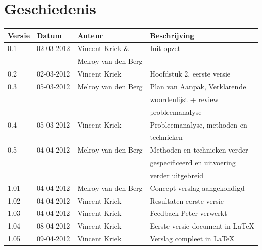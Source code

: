 \documentclass[]{article}
\begin{document}
\vspace*{\fill}

\section*{Geschiedenis}

\begin{tabular}{|| l | l | l | l ||}\hline
    Versie  &Datum       &Auteur              &Beschrijving                    \\\hline\hline
    0.1     &02-03-2012  &Vincent Kriek \&    &Init opzet                      \\
            &            &Melroy van den Berg &                                \\\hline
    0.2     &02-03-2012  &Vincent Kriek       &Hoofdstuk 2, eerste versie      \\\hline
    0.3     &05-03-2012  &Melroy van den Berg &Plan van Aanpak, Verklarende    \\
            &            &                    &woordenlijst + review           \\
            &            &                    &probleemanalyse                 \\\hline
    0.4     &05-03-2012  &Vincent Kriek       &Probleemanalyse, methoden en    \\
            &            &                    &technieken                      \\\hline
    0.5     &04-04-2012  &Melroy van den Berg &Methoden en technieken verder   \\
            &            &                    &gespecificeerd en uitvoering    \\
            &            &                    &verder uitgebreid               \\\hline
    1.01    &04-04-2012  &Melroy van den Berg &Concept verslag aangekondigd    \\\hline
    1.02    &04-04-2012  &Vincent Kriek       &Resultaten eerste versie        \\\hline
    1.03    &04-04-2012  &Vincent Kriek       &Feedback Peter verwerkt         \\\hline
    1.04    &08-04-2012  &Vincent Kriek       &Eerste versie document in \LaTeX\\\hline
    1.05    &09-04-2012  &Vincent Kriek       &Verslag compleet in \LaTeX      \\\hline
\end{tabular}
\end{document}
